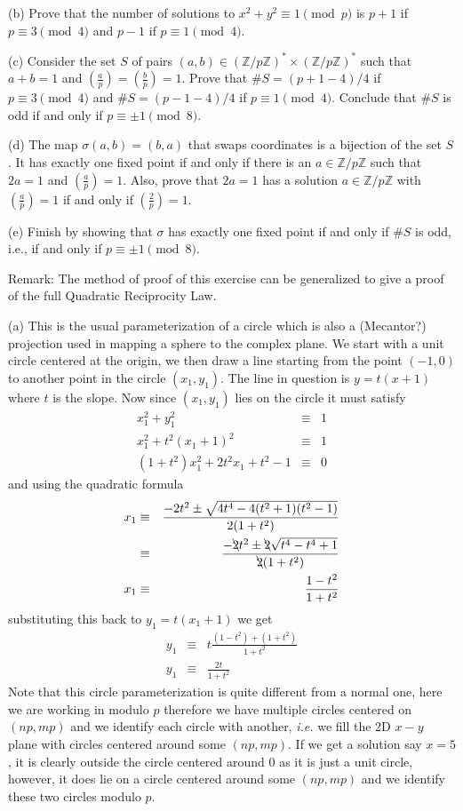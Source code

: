 \documentclass[aps,preprint,preprintnumbers,nofootinbib,showpacs,prd]{revtex4-1}
\newcommand{\ie}{{\it i.e.} }
\newcommand{\nbea}{\begin{eqnarray*}}
\newcommand{\neea}{\end{eqnarray*}}
\begin{document}
(b) Prove that the number of solutions to $x^2 + y^2 \equiv 1 \pmod {p}$ is $p + 1$ if $p \equiv 3 \pmod {4}$ and $p-1$ if $p \equiv 1 \pmod {4}$.

(c) Consider the set $S$ of pairs $(a,b) \in (\mathbb{Z}/p\mathbb{Z})^*\times(\mathbb{Z}/p\mathbb{Z})^*$ such that $a + b = 1$ and $\left (\frac{a} {p} \right )=\left ( \frac{b} {p} \right )= 1$. Prove that $\#S = (p + 1-4)/4$ if $p \equiv 3 \pmod {4}$ and $\#S = (p - 1 - 4)/4$ if $p \equiv 1 \pmod 4$. Conclude that $\#S$ is odd if and only if $p \equiv \pm1 \pmod {8}$.

(d) The map $\sigma(a,b) = (b,a)$ that swaps coordinates is a bijection of the set $S$. It has exactly one fixed point if and only if there is an $a \in \mathbb{Z}/p\mathbb{Z}$ such that $2a = 1$ and $\left (\frac{a} {p} \right )= 1$. Also, prove that $2a = 1$ has a solution $a \in \mathbb{Z}/p\mathbb{Z}$ with $\left (\frac{a} {p} \right )= 1$ if and only if $\left (\frac{2} {p} \right )= 1$.

(e) Finish by showing that $\sigma$ has exactly one fixed point if and only if $\#S$ is odd, i.e., if and only if $p \equiv \pm 1 \pmod {8}$.

Remark: The method of proof of this exercise can be generalized to give a proof of the full Quadratic Reciprocity Law.

(a) This is the usual parameterization of a circle which is also a (Mecantor?) projection used in mapping a sphere to the complex plane. We start with a unit circle centered at the origin, we then draw a line starting from the point $(-1,0)$ to another point in the circle $(x_1,y_1)$. The line in question is $y = t(x+1)$ where $t$ is the slope. Now since $(x_1,y_1)$ lies on the circle it must satisfy
%
\nbea
x^2_1 + y^2_1 & \equiv & 1 \\
x^2_1 + t^2(x_1 + 1)^2 & \equiv & 1 \\
(1 + t^2)x^2_1 + 2 t^2 x_1 +t^2 - 1 & \equiv & 0
\neea
%
and using the quadratic formula
%
\nbea
x_1 & \equiv & \frac{-2t^2 \pm \sqrt{4t^4 - 4(t^2+1)(t^2-1)}}{2(1+t^2)} \\
& \equiv & \frac{-\bcancel{2}t^2 \pm \bcancel{2}\sqrt{t^4 - t^4+1}}{\bcancel{2}(1+t^2)} \\
x_1 & \equiv & \frac{1-t^2}{1+t^2}
\neea
%
substituting this back to $y_1 = t(x_1+1)$ we get
%
\nbea
y_1 & \equiv & t \frac{(1-t^2) + (1+t^2)}{1+t^2} \\
y_1 & \equiv & \frac{2t}{1+t^2}
\neea
%
Note that this circle parameterization is quite different from a normal one, here we are working in modulo $p$ therefore we have multiple circles centered on $(np,mp)$ and we identify each circle with another, \ie we fill the 2D $x-y$ plane with circles centered around some $(np,mp)$. If we get a solution say $x=5$, it is clearly outside the circle centered around 0 as it is just a unit circle, however, it does lie on a circle centered around some $(np,mp)$ and we identify these two circles modulo $p$.
\end{document}
